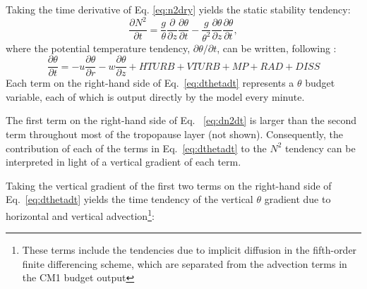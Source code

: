 \documentclass{ametsoc}
\begin{document}
Taking the time derivative of Eq. \ref{eq:n2dry} yields the static stability tendency:
   \begin{equation} \label{eq:dn2dt}
   \frac{\partial N^2}{\partial t} = \frac{g}{\theta}\frac{\partial}{\partial z}\frac{\partial \theta}{\partial t}-\frac{g}{\theta^2}\frac{\partial \theta}{\partial z}\frac{\partial \theta}{\partial t},
   \end{equation}
where the potential temperature tendency, $\partial \theta/\partial t$, can be written, following \cite{Bryan2017}:
   \begin{equation} \label{eq:dthetadt}
   \frac{\partial \theta}{\partial t} = -u\frac{\partial\theta}{\partial r}-w\frac{\partial \theta}{\partial z}+HTURB+VTURB+MP+RAD+DISS
   \end{equation}
Each term on the right-hand side of Eq.~\ref{eq:dthetadt} represents a $\theta$ budget variable, each of which is output directly by the model every minute.

The first term on the right-hand side of Eq. ~\ref{eq:dn2dt} is larger than the second term throughout most of the tropopause layer (not shown).
Consequently, the contribution of each of the terms in Eq.~\ref{eq:dthetadt} to the $N^2$ tendency can be interpreted in light of a vertical gradient of each term.

Taking the vertical gradient of the first two terms on the right-hand side of Eq.~\ref{eq:dthetadt} yields the time tendency of the vertical $\theta$ gradient due to horizontal and vertical advection\footnote{These terms include the tendencies due to implicit diffusion in the fifth-order finite differencing scheme, which are separated from the advection terms in the CM1 budget output}:
\end{document}
